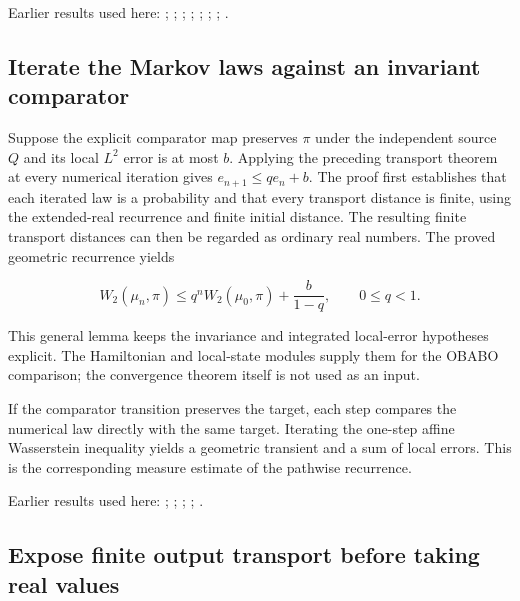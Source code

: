 \documentclass[11pt,a4paper]{report}
\begin{document}
Earlier results used here: \cite[Section~3.17.1]{LangevinLean2026ULASC}; \cite[Section~3.17.16]{LangevinLean2026ULASC}; \cite[Section~3.17.2]{LangevinLean2026ULASC}; \cite[Section~3.17.3]{LangevinLean2026ULASC}; \cite[Section~3.18.1]{LangevinLean2026ULASC}; \cite[Section~3.22.10]{LangevinLean2026ULASC}; \cite[Section~3.22.15]{LangevinLean2026ULASC}; \cite[Section~3.22.2]{LangevinLean2026ULASC}.
\subsection{\texorpdfstring{Iterate the Markov laws against an invariant comparator}{Iterate the Markov laws against an invariant comparator}}
\label{report-step-KineticLangevin-RandomMapPerturbation-lean-2}


Suppose the explicit comparator map preserves \(\pi\) under the independent source \(Q\) and its local \(L^{2}\) error is at most \(b\). Applying the preceding transport theorem at every numerical iteration gives \(e_{n+1}\le qe_n+b\). The proof first establishes that each iterated law is a probability and that every transport distance is finite, using the extended-real recurrence and finite initial distance. The resulting finite transport distances can then be regarded as ordinary real numbers. The proved geometric recurrence yields

\[W_2(\mu_n,\pi)\le q^nW_2(\mu_0,\pi)+\frac{b}{1-q},\qquad0\le q<1.\]

This general lemma keeps the invariance and integrated local-error hypotheses explicit. The Hamiltonian and local-state modules supply them for the OBABO comparison; the convergence theorem itself is not used as an input.



If the comparator transition preserves the target, each step compares the numerical law directly with the same target. Iterating the one-step affine Wasserstein inequality yields a geometric transient and a sum of local errors. This is the corresponding measure estimate of the pathwise recurrence.



Earlier results used here: \cite[Section~3.15.3]{LangevinLean2026ULASC}; \cite[Section~3.17.3]{LangevinLean2026ULASC}; \cite[Section~3.17.4]{LangevinLean2026ULASC}; \cite[Section~3.33.11]{LangevinLean2026ULASC}; \cite[Section~3.33.6]{LangevinLean2026ULASC}.
\subsection{\texorpdfstring{Expose finite output transport before taking real values}{Expose finite output transport before taking real values}}
\label{report-step-KineticLangevin-RandomMapPerturbation-lean-3}
\end{document}
